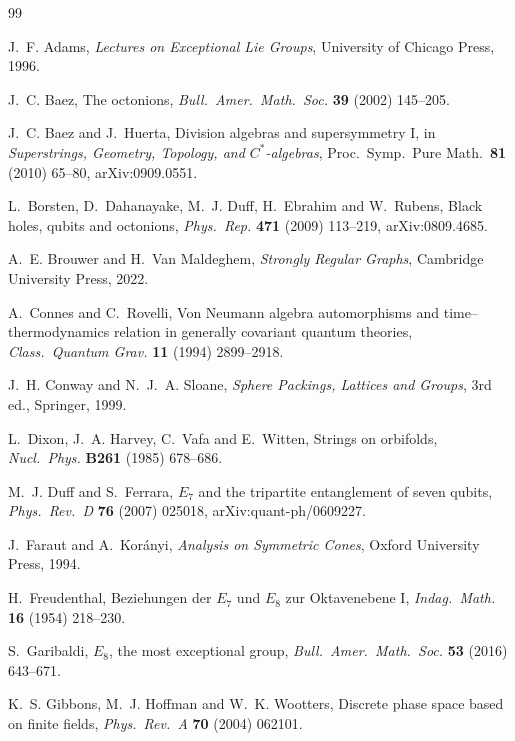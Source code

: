 \begin{thebibliography}{99}
\small

 J.~F. Adams, \emph{Lectures on Exceptional Lie Groups}, University of
Chicago Press, 1996.

 J.~C. Baez, The octonions, \emph{Bull.\ Amer.\ Math.\ Soc.} \textbf{39}
(2002) 145--205.

 J.~C. Baez and J.~Huerta, Division algebras and supersymmetry I, in
\emph{Superstrings, Geometry, Topology, and $C^*$-algebras}, Proc.\ Symp.\ Pure Math.\
\textbf{81} (2010) 65--80, arXiv:0909.0551.

 L.~Borsten, D.~Dahanayake, M.~J. Duff, H.~Ebrahim and W.~Rubens, Black
holes, qubits and octonions, \emph{Phys.\ Rep.} \textbf{471} (2009) 113--219,
arXiv:0809.4685.

 A.~E. Brouwer and H.~Van Maldeghem, \emph{Strongly Regular Graphs},
Cambridge University Press, 2022.

 A.~Connes and C.~Rovelli, Von Neumann algebra automorphisms and
time--thermodynamics relation in generally covariant quantum theories, \emph{Class.\
Quantum Grav.} \textbf{11} (1994) 2899--2918.

 J.~H. Conway and N.~J.~A. Sloane, \emph{Sphere Packings, Lattices and
Groups}, 3rd ed., Springer, 1999.

 L.~Dixon, J.~A. Harvey, C.~Vafa and E.~Witten, Strings on orbifolds,
\emph{Nucl.\ Phys.} \textbf{B261} (1985) 678--686.

 M.~J. Duff and S.~Ferrara, $E_7$ and the tripartite entanglement of
seven qubits, \emph{Phys.\ Rev.\ D} \textbf{76} (2007) 025018, arXiv:quant-ph/0609227.

\bibitem{FarautKoranyi} J.~Faraut and A.~Kor\'anyi, \emph{Analysis on Symmetric Cones},
Oxford University Press, 1994.

 H.~Freudenthal, Beziehungen der $E_7$ und $E_8$ zur Oktavenebene I,
\emph{Indag.\ Math.} \textbf{16} (1954) 218--230.

 S.~Garibaldi, $E_8$, the most exceptional group, \emph{Bull.\ Amer.\
Math.\ Soc.} \textbf{53} (2016) 643--671.

\bibitem{GHW} K.~S. Gibbons, M.~J. Hoffman and W.~K. Wootters, Discrete phase space based on
finite fields, \emph{Phys.\ Rev.\ A} \textbf{70} (2004) 062101.


\end{thebibliography}
